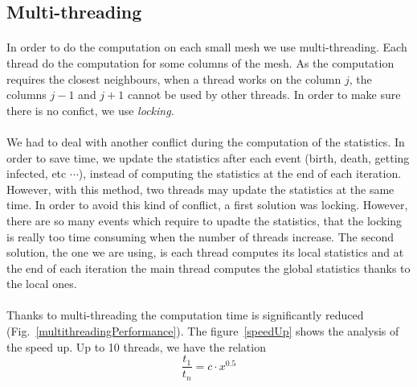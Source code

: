 \documentclass{article}
\begin{document}
\subsection{Multi-threading}
\paragraph{}
In order to do the computation on each small mesh we use multi-threading. Each thread do the computation for some columns of the mesh. As the computation requires the closest neighbours, when a thread works on the column $j$, the columns $j-1$ and $j+1$ cannot be used by other threads. In order to make sure there is no confict, we use \emph{locking}.
\paragraph{}
We had to deal with another conflict during the computation of the statistics. In order to save time, we update the statistics after each event (birth, death, getting infected, etc $\cdots$), instead of computing the statistics at the end of each iteration. However, with this method, two threads may update the statistics at the same time. In order to avoid this kind of conflict, a first solution was locking. However, there are so many events which require to upadte the statistics, that the locking is really too time consuming when the number of threads increase. The second solution, the one we are using, is each thread computes its local statistics and at the end of each iteration the main thread computes the global statistics thanks to the local ones.
\paragraph{}
Thanks to multi-threading the computation time is significantly reduced (Fig.~\ref{multithreadingPerformance}). The figure~\ref{speedUp} shows the analysis of the speed up. Up to 10 threads, we have the relation
    \[
        \frac{t_1}{t_n} = c \cdot x^{0.5}
    \]
\end{document}
